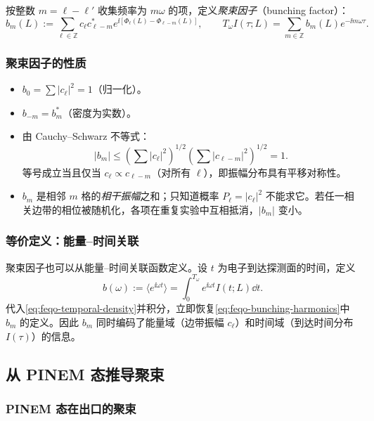 按整数 $m=\ell-\ell'$ 收集频率为 $m\omega$ 的项，定义\emph{聚束因子}（bunching factor）：
\begin{equation}
b_m(L):=\sum_{\ell\in\mathbb{Z}}c_\ell c_{\ell-m}^*
e^{\ii[\Phi_\ell(L)-\Phi_{\ell-m}(L)]},
\qquad
T_\omega I(\tau;L)=\sum_{m\in\mathbb{Z}}b_m(L)e^{-\ii m\omega\tau}.
\label{eq:feqo-bunching-harmonics}
\end{equation}

\subsubsection{聚束因子的性质}

\begin{itemize}
\item $b_0=\sum|c_\ell|^2=1$（归一化）。
\item $b_{-m}=b_m^*$（密度为实数）。
\item 由 Cauchy--Schwarz 不等式：
\begin{equation}
|b_m|\leq\left(\sum|c_\ell|^2\right)^{1/2}\left(\sum|c_{\ell-m}|^2\right)^{1/2}=1.
\label{eq:feqo-bunching-bound}
\end{equation}
等号成立当且仅当 $c_\ell\propto c_{\ell-m}$（对所有 $\ell$），即振幅分布具有平移对称性。
\item $b_m$ 是相邻 $m$ 格的\emph{相干振幅}之和；只知道概率 $P_\ell=|c_\ell|^2$ 不能求它。若任一相关边带的相位被随机化，各项在重复实验中互相抵消，$|b_m|$ 变小。
\end{itemize}

\subsubsection{等价定义：能量--时间关联}

聚束因子也可以从能量--时间关联函数定义。设 $t$ 为电子到达探测面的时间，定义
\begin{equation}
b(\omega):=\langle e^{\ii\omega t}\rangle=\int_0^{T_\omega}e^{\ii\omega t}I(t;L)\dd t.
\label{eq:feqo-bunching-alt}
\end{equation}
代入\cref{eq:feqo-temporal-density}并积分，立即恢复\cref{eq:feqo-bunching-harmonics}中 $b_m$ 的定义。因此 $b_m$ 同时编码了能量域（边带振幅 $c_\ell$）和时间域（到达时间分布 $I(\tau)$）的信息。

\subsection{从 PINEM 态推导聚束}

\subsubsection{PINEM 态在出口的聚束}

